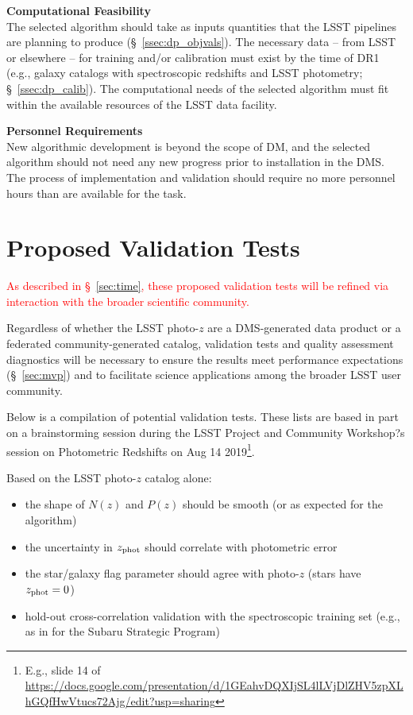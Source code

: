 \documentclass[DM,lsstdraft,toc]{lsstdoc}
\begin{document}
{\bf Computational Feasibility}\\
The selected algorithm should take as inputs quantities that the LSST pipelines are planning to produce (\S~\ref{ssec:dp_objvals}).
The necessary data -- from LSST or elsewhere -- for training and/or calibration must exist by the time of DR1 (e.g., galaxy catalogs with spectroscopic redshifts and LSST photometry; \S~\ref{ssec:dp_calib}).
The computational needs of the selected algorithm must fit within the available resources of the LSST data facility. 

{\bf Personnel Requirements}\\
New algorithmic development is beyond the scope of DM, and the selected algorithm should not need any new progress prior to installation in the DMS.
The process of implementation and validation should require no more personnel hours than are available for the task.


\clearpage
\section{Proposed Validation Tests} \label{sec:val}

\textcolor{red}{As described in \S~\ref{sec:time}, these proposed validation tests will be refined via interaction with the broader scientific community.}

Regardless of whether the LSST photo-$z$ are a DMS-generated data product or a federated community-generated catalog, validation tests and quality assessment diagnostics will be necessary to ensure the results meet performance expectations (\S~\ref{sec:mvp}) and to facilitate science applications among the broader LSST user community. 

Below is a compilation of potential validation tests. 
These lists are based in part on a brainstorming session during the LSST Project and Community Workshop?s session on Photometric Redshifts on Aug 14 2019\footnote{E.g., slide 14 of \url{https://docs.google.com/presentation/d/1GEahvDQXIjSL4lLVjDlZHV5zpXLhGQfHwVtucs72Ajg/edit?usp=sharing}}.

Based on the LSST photo-$z$ catalog alone:
\vspace{-15pt}
\begin{itemize}
\item the shape of $N(z)$ and $P(z)$ should be smooth (or as expected for the algorithm)
\item the uncertainty in $z_{\rm phot}$ should correlate with photometric error
\item the star/galaxy flag parameter should agree with photo-$z$ (stars have $z_{\rm phot}=0$)
\item hold-out cross-correlation validation with the spectroscopic training set (e.g., as in \cite{2018PASJ...70S...9T} for the Subaru Strategic Program)
\end{itemize}
\end{document}
